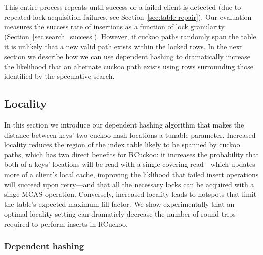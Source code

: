 This entire process repeats until success or a failed client is
detected (due to repeated lock acquisition failures, see
Section~\ref{sec:table-repair}).  Our evaluation measures the success
rate of insertions as a function of lock granularity
(Section~\ref{sec:search_success}).
However, if cuckoo paths randomly span the table it is unlikely that a
new valid path exists within the locked rows.  In the next section we
describe how we can use dependent hashing to dramatically increase the
likelihood that an alternate cuckoo path exists using rows surrounding
those identified by the speculative search.




\subsection{Locality}



In this section we introduce our dependent hashing algorithm that
makes the distance between keys' two cuckoo hash locations a tunable
parameter.  Increased locality reduces the region of the index table likely
to be spanned by cuckoo paths, which has two direct benefits for
RCuckoo: it increases the probability that both of a keys' locations
will be read with a single covering read---which updates more of a
client's local cache, improving the liklihood that failed insert
operations will succeed upon retry---and that all the necessary locks
can be acquired with a singe MCAS operation.  Conversely, increased
locality leads to hotspots that limit the table's expected maximum
fill factor.  We show experimentally that an optimal locality setting
can dramaticly decrease the number of round trips required to
perform inserts in RCuckoo.


\subsubsection{Dependent hashing}

